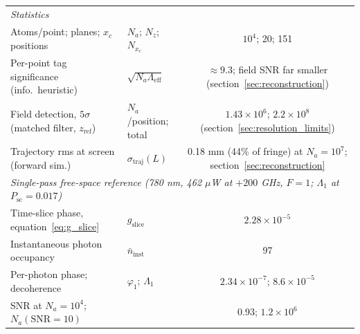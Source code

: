 \documentclass[11pt,a4paper]{article}
\begin{document}
\begin{table}[htbp]
{\begin{tabular}{llll}
\midrule
\multicolumn{4}{l}{\emph{Statistics}}\\
Atoms/point; planes; $x_c$ positions & $N_a$; $N_z$; $N_{x_c}$ & \multicolumn{2}{c}{$10^4$; 20; 151} \\
Per-point tag significance (info.\ heuristic) & $\sqrt{N_a\Lambda_\text{eff}}$ & \multicolumn{2}{c}{$\approx 9.3$; field SNR far smaller (section~\ref{sec:reconstruction})} \\
Field detection, $5\sigma$ (matched filter, $z_\text{ref}$) & $N_a$/position; total & \multicolumn{2}{c}{$1.43\times 10^6$; $2.2\times 10^8$ (section~\ref{sec:resolution_limits})} \\
Trajectory rms at screen (forward sim.) & $\sigma_\text{traj}(L)$ & \multicolumn{2}{c}{0.18 mm (44\% of fringe) at $N_a{=}10^7$; section~\ref{sec:reconstruction}} \\
\midrule
\multicolumn{4}{l}{\emph{Single-pass free-space reference (780 nm, 462 $\mu$W at $+200$ GHz, $F = 1$; $\Lambda_1$ at $P_\text{sc} = 0.017$)}}\\
Time-slice phase, equation~\eqref{eq:g_slice} & $g_\text{slice}$ & \multicolumn{2}{c}{$2.28\times 10^{-5}$} \\
Instantaneous photon occupancy & $\bar{n}_\text{inst}$ & \multicolumn{2}{c}{97} \\
Per-photon phase; decoherence & $\varphi_1$; $\Lambda_1$ & \multicolumn{2}{c}{$2.34\times 10^{-7}$; $8.6\times 10^{-5}$} \\
SNR at $N_a = 10^4$; $N_a(\text{SNR}{=}10)$ & & \multicolumn{2}{c}{0.93; $1.2\times 10^6$} \\
\bottomrule
\end{tabular}}
\end{table}
\end{document}
